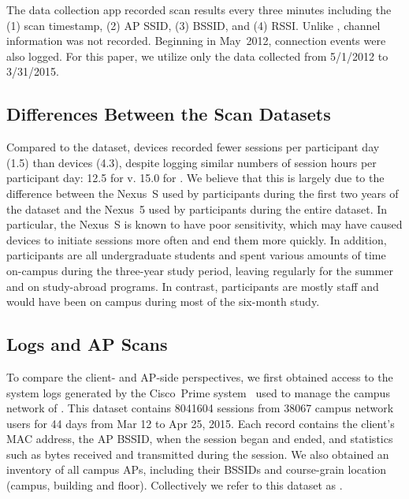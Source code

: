 The \NetSense{} data collection app recorded scan results every three
minutes including the (1) scan timestamp, (2) AP SSID, (3) BSSID, and (4) RSSI.
Unlike \ubscan{}, channel information was not recorded.  Beginning in May~2012,
\wifi{} connection events were also logged. For this paper, we utilize only the
data collected from 5/1/2012 to 3/31/2015.

\subsection{Differences Between the Scan Datasets}


Compared to the \ubscan{} dataset, \NetSense{} devices recorded fewer
sessions per participant day (1.5) than \PhoneLab{} devices (4.3), despite
logging similar numbers of session hours per participant day: 12.5 for
\ndscan{} v. 15.0 for \ubscan{}. We believe that this is largely due to the
difference between the Nexus~S used by \NetSense{} participants during the
first two years of the \ndscan{} dataset and the Nexus~5 used by \PhoneLab{}
participants during the entire \ubscan{} dataset. In particular, the Nexus~S
is known to have poor \wifi{} sensitivity, which may have caused \NetSense{}
devices to initiate sessions more often and end them more quickly. In
addition, \NetSense{} participants are all undergraduate students and spent
various amounts of time on-campus during the three-year study period, leaving
regularly for the summer and on study-abroad programs. In contrast,
\PhoneLab{} participants are mostly staff and would have been on campus
during most of the six-month study.

\subsection{\ub{} \wifi{} Logs and AP Scans}
\label{subsec:cit}

To compare the client- and AP-side perspectives, we first obtained access to the
system logs generated by the Cisco~Prime system~\cite{ciscoprime} used to manage
the campus \wifi{} network of \ub{}. This dataset contains \num{8041604} \wifi{}
sessions from \num{38067} \ub{} campus network users for 44 days from Mar 12 to Apr
25, 2015. Each record contains the client's MAC address, the AP BSSID, when the
\wifi{} session began and ended, and statistics such as bytes received and
transmitted during the session. We also obtained an inventory of all
\ub{} campus APs, including their BSSIDs and course-grain location (campus,
building and floor). Collectively we refer to
this dataset as \textbf{\ubap{}}.

